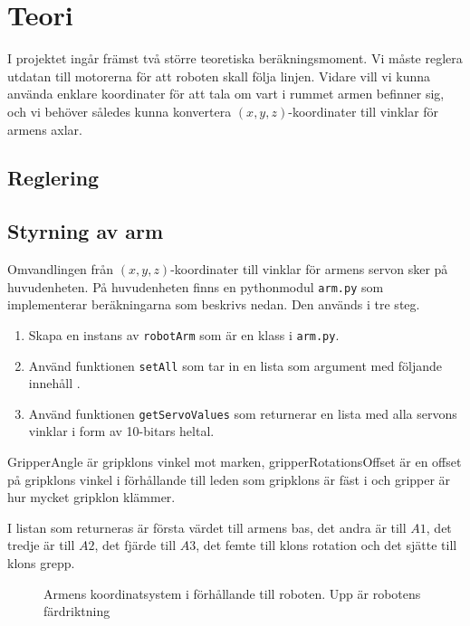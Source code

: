 \section{Teori}
I projektet ingår främst två större teoretiska beräkningsmoment. Vi måste reglera utdatan till motorerna för att roboten skall följa linjen. Vidare vill vi kunna använda enklare koordinater för att tala om vart i rummet armen befinner sig, och vi behöver således kunna konvertera $(x,y,z)$-koordinater till vinklar för armens axlar.

\subsection{Reglering}

\subsection{Styrning av arm}
Omvandlingen från $(x,y,z)$-koordinater till vinklar för armens servon sker på huvudenheten. På huvudenheten finns en pythonmodul \texttt{arm.py} som implementerar beräkningarna som beskrivs nedan. Den används i tre steg.
\begin{enumerate}
	\item Skapa en instans av \texttt{robotArm} som är en klass i \texttt{arm.py}.
	\item Använd funktionen \texttt{setAll} som tar in en lista som argument med följande innehåll .
	\item Använd funktionen \texttt{getServoValues} som returnerar en lista med alla servons vinklar i form av 10-bitars heltal.
\end{enumerate}

GripperAngle är gripklons vinkel mot marken, gripperRotationsOffset är en offset på gripklons vinkel i förhållande till leden som gripklons är fäst i och gripper är hur mycket gripklon klämmer.

I listan som returneras är första värdet till armens bas, det andra är till $A1$, det tredje är till $A2$, det fjärde till $A3$, det femte till klons rotation och det sjätte till klons grepp.

\begin{figure}[h!]
	\centerline{}
	\caption{Armens koordinatsystem i förhållande till roboten. Upp är robotens färdriktning}
\end{figure}

